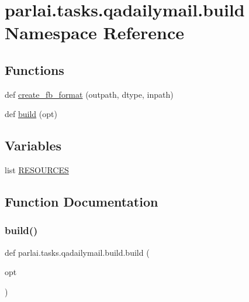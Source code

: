 \hypertarget{namespaceparlai_1_1tasks_1_1qadailymail_1_1build}{}\section{parlai.\+tasks.\+qadailymail.\+build Namespace Reference}
\label{namespaceparlai_1_1tasks_1_1qadailymail_1_1build}
\subsection*{Functions}
\begin{DoxyCompactItemize}
\item 
def \hyperlink{namespaceparlai_1_1tasks_1_1qadailymail_1_1build_a91296a105f8b2d3f5c53d34282cf6e62}{create\+\_\+fb\+\_\+format} (outpath, dtype, inpath)
\item 
def \hyperlink{namespaceparlai_1_1tasks_1_1qadailymail_1_1build_ac5d9b858a94d4fe241cd57a6fd0ccf1c}{build} (opt)
\end{DoxyCompactItemize}
\subsection*{Variables}
\begin{DoxyCompactItemize}
\item 
list \hyperlink{namespaceparlai_1_1tasks_1_1qadailymail_1_1build_aa458d08dd58129a0b107f338e714f439}{R\+E\+S\+O\+U\+R\+C\+ES}
\end{DoxyCompactItemize}


\subsection{Function Documentation}
\mbox{\label{namespaceparlai_1_1tasks_1_1qadailymail_1_1build_ac5d9b858a94d4fe241cd57a6fd0ccf1c}} 
\subsubsection{\texorpdfstring{build()}{build()}}
{\footnotesize\ttfamily def parlai.\+tasks.\+qadailymail.\+build.\+build (\begin{DoxyParamCaption}\item[{}]{opt }\end{DoxyParamCaption})}

